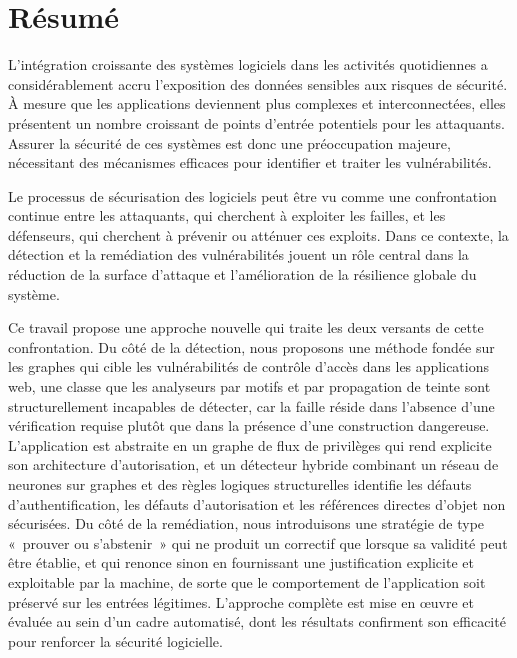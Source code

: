\documentclass[11pt,a4paper]{report}
\begin{document}
\chapter*{Résumé}

L'intégration croissante des systèmes logiciels dans les activités quotidiennes a
considérablement accru l'exposition des données sensibles aux risques de sécurité.
À mesure que les applications deviennent plus complexes et interconnectées, elles
présentent un nombre croissant de points d'entrée potentiels pour les attaquants.
Assurer la sécurité de ces systèmes est donc une préoccupation majeure, nécessitant
des mécanismes efficaces pour identifier et traiter les vulnérabilités.

Le processus de sécurisation des logiciels peut être vu comme une confrontation continue
entre les attaquants, qui cherchent à exploiter les failles, et les défenseurs, qui
cherchent à prévenir ou atténuer ces exploits. Dans ce contexte, la détection et la
remédiation des vulnérabilités jouent un rôle central dans la réduction de la surface
d'attaque et l'amélioration de la résilience globale du système.

Ce travail propose une approche nouvelle qui traite les deux versants de cette
confrontation. Du côté de la détection, nous proposons une méthode fondée sur les graphes
qui cible les vulnérabilités de contrôle d'accès dans les applications web, une classe que
les analyseurs par motifs et par propagation de teinte sont structurellement incapables de
détecter, car la faille réside dans l'absence d'une vérification requise plutôt que dans la
présence d'une construction dangereuse. L'application est abstraite en un graphe de flux de
privilèges qui rend explicite son architecture d'autorisation, et un détecteur hybride
combinant un réseau de neurones sur graphes et des règles logiques structurelles identifie
les défauts d'authentification, les défauts d'autorisation et les références directes
d'objet non sécurisées. Du côté de la remédiation, nous introduisons une stratégie de type «~prouver ou
s'abstenir~» qui ne produit un correctif que lorsque sa validité peut être établie, et
qui renonce sinon en fournissant une justification explicite et exploitable par la
machine, de sorte que le comportement de l'application soit préservé sur les entrées
légitimes. L'approche complète est mise en œuvre et évaluée au sein d'un cadre
automatisé, dont les résultats confirment son efficacité pour renforcer la sécurité
logicielle.
\end{document}
